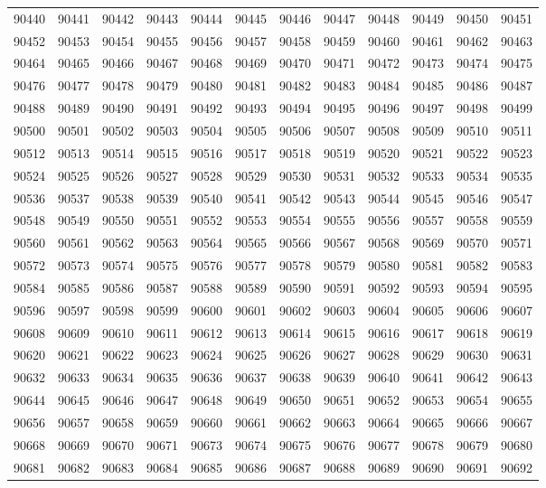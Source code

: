 \begin{center}
\begin{longtable}{llllllllllll}
90440 &90441 &90442 &90443 &90444 &90445 &90446 &90447 &90448 &90449 &90450 &90451 \\
90452 &90453 &90454 &90455 &90456 &90457 &90458 &90459 &90460 &90461 &90462 &90463 \\
90464 &90465 &90466 &90467 &90468 &90469 &90470 &90471 &90472 &90473 &90474 &90475 \\
90476 &90477 &90478 &90479 &90480 &90481 &90482 &90483 &90484 &90485 &90486 &90487 \\
90488 &90489 &90490 &90491 &90492 &90493 &90494 &90495 &90496 &90497 &90498 &90499 \\
90500 &90501 &90502 &90503 &90504 &90505 &90506 &90507 &90508 &90509 &90510 &90511 \\
90512 &90513 &90514 &90515 &90516 &90517 &90518 &90519 &90520 &90521 &90522 &90523 \\
90524 &90525 &90526 &90527 &90528 &90529 &90530 &90531 &90532 &90533 &90534 &90535 \\
90536 &90537 &90538 &90539 &90540 &90541 &90542 &90543 &90544 &90545 &90546 &90547 \\
90548 &90549 &90550 &90551 &90552 &90553 &90554 &90555 &90556 &90557 &90558 &90559 \\
90560 &90561 &90562 &90563 &90564 &90565 &90566 &90567 &90568 &90569 &90570 &90571 \\
90572 &90573 &90574 &90575 &90576 &90577 &90578 &90579 &90580 &90581 &90582 &90583 \\
90584 &90585 &90586 &90587 &90588 &90589 &90590 &90591 &90592 &90593 &90594 &90595 \\
90596 &90597 &90598 &90599 &90600 &90601 &90602 &90603 &90604 &90605 &90606 &90607 \\
90608 &90609 &90610 &90611 &90612 &90613 &90614 &90615 &90616 &90617 &90618 &90619 \\
90620 &90621 &90622 &90623 &90624 &90625 &90626 &90627 &90628 &90629 &90630 &90631 \\
90632 &90633 &90634 &90635 &90636 &90637 &90638 &90639 &90640 &90641 &90642 &90643 \\
90644 &90645 &90646 &90647 &90648 &90649 &90650 &90651 &90652 &90653 &90654 &90655 \\
90656 &90657 &90658 &90659 &90660 &90661 &90662 &90663 &90664 &90665 &90666 &90667 \\
90668 &90669 &90670 &90671 &90673 &90674 &90675 &90676 &90677 &90678 &90679 &90680 \\
90681 &90682 &90683 &90684 &90685 &90686 &90687 &90688 &90689 &90690 &90691 &90692 \\

\end{longtable}
\end{center}
